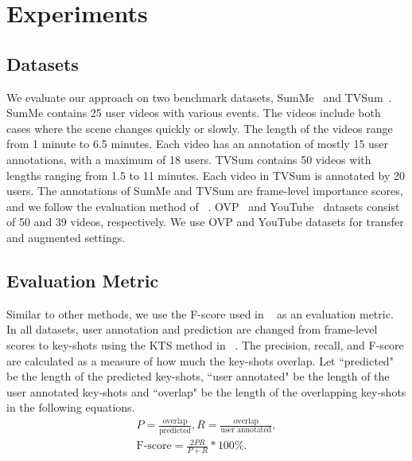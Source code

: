 \documentclass[letterpaper]{article} \usepackage{aaai19}  \usepackage{times}  \usepackage{helvet}  \usepackage{courier}  \usepackage{url}  \usepackage{graphicx}  \frenchspacing  \setlength{\pdfpagewidth}{8.5in}  \setlength{\pdfpageheight}{11in}
\begin{document}
\section{Experiments}

\subsection{Datasets}
We evaluate our approach on two benchmark datasets, SumMe~\cite{gygli2014creating} and TVSum~\cite{song2015tvsum}. SumMe contains 25 user videos with various events. The videos include both cases where the scene changes quickly or slowly. The length of the videos range from 1 minute to 6.5 minutes. Each video has an annotation of mostly 15 user annotations, with a maximum of 18 users. TVSum contains 50 videos with lengths ranging from 1.5 to 11 minutes. Each video in TVSum is annotated by 20 users. The annotations of SumMe and TVSum are frame-level importance scores, and we follow the evaluation method of ~\cite{zhang2016video}. OVP~\cite{de2011vsumm} and YouTube~\cite{de2011vsumm} datasets consist of 50 and 39 videos, respectively. We use OVP and YouTube datasets for transfer and augmented settings.


\subsection{Evaluation Metric}
Similar to other methods, we use the F-score used in ~\cite{zhang2016video} as an evaluation metric. In all datasets, user annotation and prediction are changed from frame-level scores to key-shots using the KTS method in ~\cite{zhang2016video}. The precision, recall, and F-score are calculated as a measure of how much the key-shots overlap. Let ``predicted" be the length of the predicted key-shots, ``user annotated" be the length of the user annotated key-shots and ``overlap" be the length of the overlapping key-shots in the following equations.
\begin{eqnarray}
P=\frac{\text{overlap}}{\text{predicted}},
R=\frac{\text{overlap}}{\text{user annotated}},\\
\text{F-score}=\frac{2PR}{P+R} * 100\%.
\label{equ:metric}
\end{eqnarray}

\begin{table}
\centering
{}
\caption{Evaluation setting for SumMe. In the case of TVSum, we switch between SumMe and TVSum in the above table.}
\label{tab:setting}
\end{table}
\end{document}
